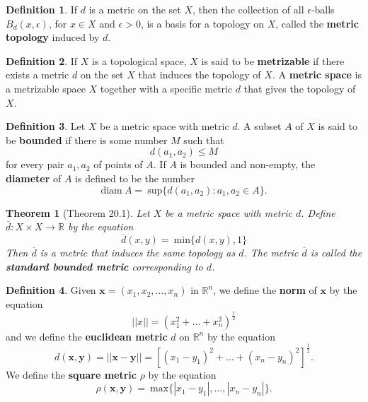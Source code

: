\documentclass{article}
\newtheorem{theorem}{Theorem}
\theoremstyle{definition}
\newtheorem{definition}{Definition}[section]
\theoremstyle{remark}
\begin{document}
    \begin{definition}
        If $d$ is a metric on the set $X$, then the collection of all $\epsilon$-balls $B_d(x,\epsilon)$, for $x\in X$ and $\epsilon>0$,
        is a basis for a topology on $X$, called the \textbf{metric topology} induced by $d$.
    \end{definition}

    \begin{definition}
        If $X$ is a topological space, $X$ is said to be \textbf{metrizable} if there exists a metric $d$ on the set $X$ that
        induces the topology of $X$. A \textbf{metric space} is a metrizable space $X$ together with a specific metric $d$ that gives
        the topology of $X$.
    \end{definition}

    \begin{definition}
        Let $X$ be a metric space with metric $d$. A subset $A$ of $X$ is said to be \textbf{bounded} if there is some number $M$
        such that
        \[ d(a_1,a_2) \leq M \]
        for every pair $a_1,a_2$ of points of $A$. If $A$ is bounded and non-empty, the \textbf{diameter} of $A$ is defined to be
        the number
        \[ \text{diam}\: A = \:\text{sup}\{d(a_1,a_2): a_1,a_2\in A\}. \]
    \end{definition}

    \begin{theorem}[Theorem 20.1]
        Let $X$ be a metric space with metric $d$. Define $\overline{d}: X\times X \to \mathbb{R}$ by the equation
        \[ \overline{d}(x,y) = \:\text{min}\{d(x,y),1\} \]
        Then $\overline{d}$ is a metric that induces the same topology as $d$. The metric $\overline{d}$ is called the
        \textbf{standard bounded metric} corresponding to $d$.
    \end{theorem}

    \begin{definition}
        Given $\mathbf{x} = (x_1,x_2,\hdots,x_n)$ in $\mathbb{R}^n$, we define the \textbf{norm} of $\mathbf{x}$ by the equation
        \[ ||x|| = (x_1^2 + \hdots + x_n^2)^{\frac{1}{2}} \]
        and we define the \textbf{euclidean metric} $d$ on $\mathbb{R}^n$ by the equation
        \[ d(\mathbf{x},\mathbf{y}) = ||\mathbf{x} - \mathbf{y}|| = [(x_1-y_1)^2 + \hdots + (x_n-y_n)^2]^{\frac{1}{2}}. \]
        We define the \textbf{square metric} $\rho$ by the equation
        \[ \rho(\mathbf{x},\mathbf{y}) =\: \text{max}\{|x_1-y_1|,\hdots,|x_n-y_n|\}. \]
    \end{definition}
\end{document}
